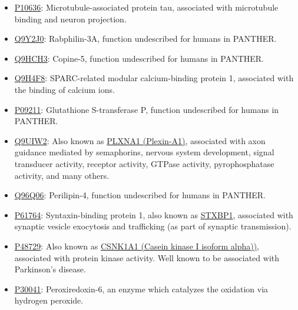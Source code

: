 {
\small

\begin{itemize}
\item \href{http://www.pantherdb.org/genes/gene.do?acc=HUMAN\%7CHGNC\%3D6893\%7CUniProtKB\%3DP10636}{P10636}: Microtubule-associated protein tau, associated with microtubule binding and neuron projection.
\item \href{http://www.pantherdb.org/genes/gene.do?acc=HUMAN\%7CHGNC\%3D17056\%7CUniProtKB\%3DQ9Y2J0}{Q9Y2J0}: Rabphilin-3A, function undescribed for humans in PANTHER.
\item \href{http://www.pantherdb.org/genes/gene.do?acc=HUMAN\%7CHGNC\%3D2318\%7CUniProtKB\%3DQ9HCH3}{Q9HCH3}: Copine-5, function undescribed for humans in PANTHER.
\item \href{http://www.pantherdb.org/genes/gene.do?acc=HUMAN\%7CHGNC\%3D20318\%7CUniProtKB\%3DQ9H4F8}{Q9H4F8}: SPARC-related modular calcium-binding protein 1, associated with the binding of calcium ions.
\item \href{http://www.pantherdb.org/genes/gene.do?acc=HUMAN\%7CHGNC\%3D4638\%7CUniProtKB\%3DP09211}{P09211}: Glutathione S-transferase P, function undescribed for humans in PANTHER.
\item \href{http://www.pantherdb.org/genes/gene.do?acc=HUMAN\%7CHGNC\%3D9099\%7CUniProtKB\%3DQ9UIW2}{Q9UIW2}: Also known as \href{https://www.uniprot.org/uniprot/Q9UIW2}{PLXNA1 (Plexin-A1)}, associated with axon guidance mediated by semaphorins, nervous system development, signal transducer activity, receptor activity, GTPase activity, pyrophosphatase activity, and many others.
\item \href{http://www.pantherdb.org/genes/gene.do?acc=HUMAN\%7CHGNC\%3D29393\%7CUniProtKB\%3DQ96Q06}{Q96Q06}: Perilipin-4, function undescribed for humans in PANTHER.
\item \href{http://www.pantherdb.org/genes/gene.do?acc=HUMAN\%7CHGNC\%3D11444\%7CUniProtKB\%3DP61764}{P61764}: Syntaxin-binding protein 1, also known as \href{https://www.uniprot.org/uniprot/P61764}{STXBP1}, associated with synaptic vesicle exocytosis and trafficking (as part of synaptic transmission).
\item \href{http://www.pantherdb.org/genes/gene.do?acc=HUMAN\%7CHGNC\%3D2451\%7CUniProtKB\%3DP48729}{P48729}: Also known as \href{https://www.uniprot.org/uniprot/P48729}{CSNK1A1 (Casein kinase I isoform alpha))}, associated with protein kinase activity. Well known to be associated with Parkinson's disease.
\item \href{http://www.pantherdb.org/genes/gene.do?acc=HUMAN\%7CHGNC\%3D16753\%7CUniProtKB\%3DP30041}{P30041}: Peroxiredoxin-6, an enzyme which catalyzes the oxidation via hydrogen peroxide.

\end{itemize}}
